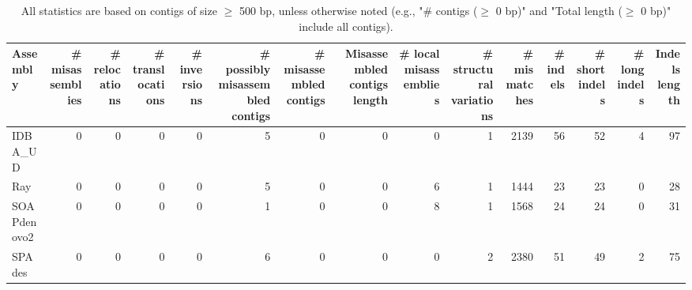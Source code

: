 \documentclass[12pt,a4paper]{article}
\begin{document}
\begin{table}[ht]
\begin{center}
\caption{All statistics are based on contigs of size $\geq$ 500 bp, unless otherwise noted (e.g., "\# contigs ($\geq$ 0 bp)" and "Total length ($\geq$ 0 bp)" include all contigs).}
\begin{tabular}{|l*{14}{|r}|}
\hline
Assembly & \# misassemblies &     \# relocations &     \# translocations &     \# inversions & \# possibly misassembled contigs & \# misassembled contigs & Misassembled contigs length & \# local misassemblies & \# structural variations & \# mismatches & \# indels &     \# short indels &     \# long indels & Indels length \\ \hline
IDBA\_UD & 0 & 0 & 0 & 0 & 5 & 0 & 0 & 0 & 1 & 2139 & 56 & 52 & 4 & 97 \\ \hline
Ray & 0 & 0 & 0 & 0 & 5 & 0 & 0 & 6 & 1 & 1444 & 23 & 23 & 0 & 28 \\ \hline
SOAPdenovo2 & 0 & 0 & 0 & 0 & 1 & 0 & 0 & 8 & 1 & 1568 & 24 & 24 & 0 & 31 \\ \hline
SPAdes & 0 & 0 & 0 & 0 & 6 & 0 & 0 & 0 & 2 & 2380 & 51 & 49 & 2 & 75 \\ \hline
\end{tabular}
\end{center}
\end{table}
\end{document}

